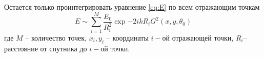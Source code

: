 Остается только проинтегрировать уравнение \eqref{eq:E} по всем отражающим
точкам 
\begin{equation}
    \label{eq:}
    E \sim \sum\limits_{i=1}^{M} \frac{E_0}{R_i^2} \exp{-2ikR_i}
    G^2(x,y,\theta_0)
\end{equation}
где $M$ -- количество точек,  $x_i,y_i$ -- координаты  $i-$ой отражающей точки,
 $R_i$-- расстояние от спутника до  $i-$ой точки.


